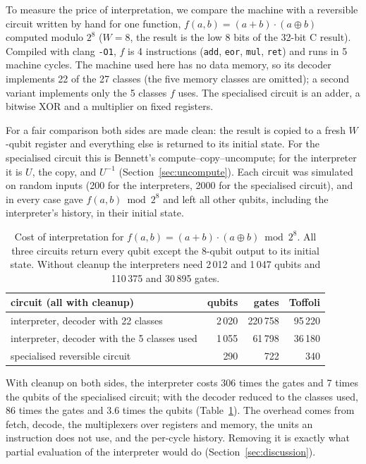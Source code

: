 \documentclass[11pt]{article}
\begin{document}
To measure the price of interpretation, we compare the machine with a reversible circuit written by
hand for one function, $f(a,b)=(a+b)\cdot(a\oplus b)$ computed modulo $2^8$ ($W=8$, the result is
the low 8 bits of the 32-bit C result). Compiled with clang \texttt{-O1}, $f$ is 4 instructions
(\texttt{add}, \texttt{eor}, \texttt{mul}, \texttt{ret}) and runs in 5 machine cycles. The machine
used here has no data memory, so its decoder implements 22 of the 27 classes (the five memory
classes are omitted); a second variant implements only the 5 classes $f$ uses. The specialised
circuit is an adder, a bitwise XOR and a multiplier on fixed registers.

For a fair comparison both sides are made clean: the result is copied to a fresh $W$-qubit
register and everything else is returned to its initial state. For the specialised circuit this is
Bennett's compute--copy--uncompute; for the interpreter it is $U$, the copy, and $U^{-1}$
(Section~\ref{sec:uncompute}). Each circuit was simulated on random inputs (200 for the
interpreters, 2000 for the specialised circuit), and in every case gave $f(a,b) \bmod 2^8$ and left all
other qubits, including the interpreter's history, in their initial state.

\begin{table}[H]
\centering
\small
\begin{tabular}{@{}lrrr@{}}
\toprule
circuit (all with cleanup) & qubits & gates & Toffoli \\
\midrule
interpreter, decoder with 22 classes & 2\,020 & 220\,758 & 95\,220 \\
interpreter, decoder with the 5 classes used & 1\,055 & 61\,798 & 36\,180 \\
specialised reversible circuit & 290 & 722 & 340 \\
\bottomrule
\end{tabular}
\caption{Cost of interpretation for $f(a,b)=(a+b)\cdot(a\oplus b) \bmod 2^8$. All three circuits
return every qubit except the 8-qubit output to its initial state. Without cleanup the interpreters
need 2\,012 and 1\,047 qubits and 110\,375 and 30\,895 gates.}
\label{tab:spec}
\end{table}

\noindent With cleanup on both sides, the interpreter costs 306 times the gates and 7 times the
qubits of the specialised circuit; with the decoder reduced to the classes used, 86 times the gates
and 3.6 times the qubits (Table~\ref{tab:spec}). The overhead comes from fetch, decode, the
multiplexers over registers and memory, the units an instruction does not use, and the per-cycle
history. Removing it is exactly what partial evaluation of the interpreter would do
(Section~\ref{sec:discussion}).
\end{document}
